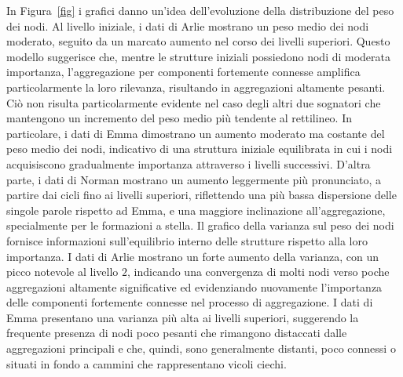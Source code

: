 In Figura~\ref{fig} i grafici danno un'idea dell'evoluzione della distribuzione del peso dei nodi.
Al livello iniziale, i dati di Arlie mostrano un peso medio dei nodi moderato, seguito da un marcato aumento nel
corso dei livelli superiori.
Questo modello suggerisce che, mentre le strutture iniziali possiedono nodi di moderata importanza,
l'aggregazione per componenti fortemente connesse amplifica particolarmente la loro rilevanza, risultando in
aggregazioni altamente pesanti.
Ciò non risulta particolarmente evidente nel caso degli altri due sognatori che mantengono un incremento del peso
medio più tendente al rettilineo.
In particolare, i dati di Emma dimostrano un aumento moderato ma costante del peso medio dei nodi, indicativo di
una struttura iniziale equilibrata in cui i nodi acquisiscono gradualmente importanza attraverso i livelli successivi.
D'altra parte, i dati di Norman mostrano un aumento leggermente più pronunciato, a partire dai cicli fino ai
livelli superiori, riflettendo una più bassa dispersione delle singole parole rispetto ad Emma, e una maggiore
inclinazione all'aggregazione, specialmente per le formazioni a stella.
Il grafico della varianza sul peso dei nodi fornisce informazioni sull'equilibrio interno delle strutture rispetto
alla loro importanza.
I dati di Arlie mostrano un forte aumento della varianza, con un picco notevole al livello $2$, indicando una convergenza
di molti nodi verso poche aggregazioni altamente significative ed evidenziando nuovamente l'importanza delle componenti
fortemente connesse nel processo di aggregazione.
I dati di Emma presentano una varianza più alta ai livelli superiori, suggerendo la frequente presenza di nodi
poco pesanti che rimangono distaccati dalle aggregazioni principali e che, quindi, sono generalmente distanti, poco
connessi o situati in fondo a cammini che rappresentano vicoli ciechi.

